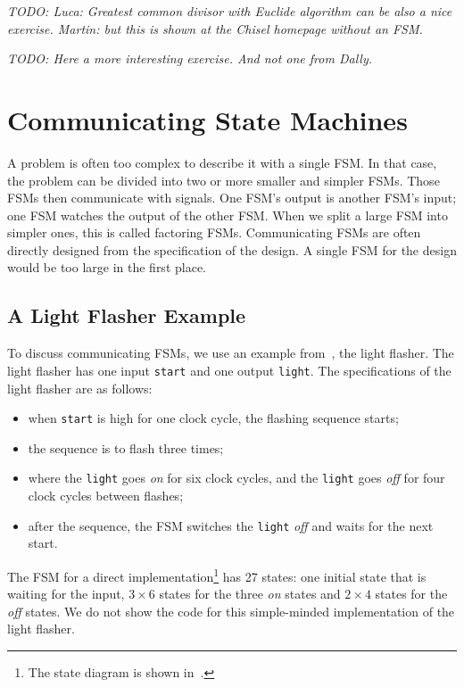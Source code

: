 \documentclass[%
    10pt,
    headinclude, footexclude,
    openright, %
    notitlepage,
    cleardoubleempty,
    headsepline,
    pointlessnumbers,
    bibtotoc, idxtotoc,
    ]{scrbook}
\newcommand{\code}[1]{{\lstinline[basicstyle=\small\ttfamily]{#1}}}
\newcommand{\todo}[1]{{\emph{TODO: #1}}}
\begin{document}
\todo{Luca: Greatest common divisor with Euclide algorithm can be also a nice exercise.
Martin: but this is shown at the Chisel homepage without an FSM.}

\todo{Here a more interesting exercise. And not one from Dally.}

\chapter{Communicating State Machines}

A problem is often too complex to describe it with a single FSM.
In that case, the problem can be divided into two or more smaller and simpler FSMs.
Those FSMs then communicate with signals. One FSM's output is
another FSM's input; one FSM watches the output of the other FSM.
When we split a large FSM into simpler ones, this is called factoring FSMs.
Communicating FSMs are often directly designed from the specification
of the design. A single FSM for the design would be too large in the first place.

\section{A Light Flasher Example}

To discuss communicating FSMs, we use an example
from~\cite[Chapter~17]{dally:vhdl:2016}, the light flasher.
The light flasher has one input \code{start} and one output
\code{light}. The specifications of the light flasher are as follows:
\begin{itemize}
\item when \code{start} is high for one clock cycle, the flashing
sequence starts;
\item the sequence is to flash three times;
\item where the \code{light} goes \emph{on} for six clock cycles, and the \code{light} goes \emph{off} for four clock cycles between flashes;
\item after the sequence, the FSM switches the \code{light} \emph{off} and waits
for the next start.
\end{itemize}

The FSM for a direct implementation\footnote{The state diagram is shown
in~\cite[p.~376]{dally:vhdl:2016}.} has 27 states:
one initial state that is waiting for the input, $3 \times 6$ states for the three
\emph{on} states and $2 \times 4$ states for the \emph{off} states.
We do not show the code for this simple-minded implementation of the light
flasher.
\end{document}
